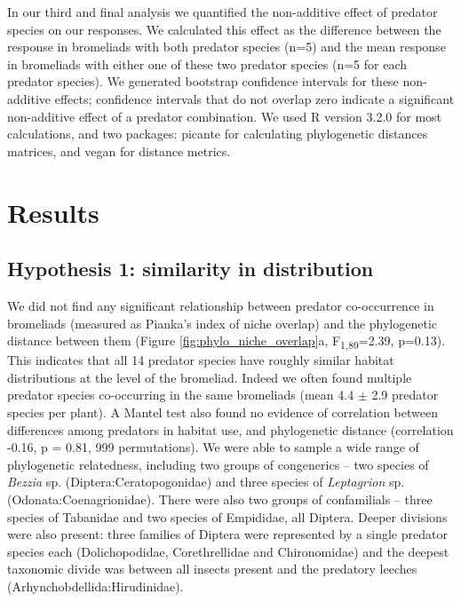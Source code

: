 \documentclass[11pt]{article}
\begin{document}
In our third and final analysis we quantified the non-additive effect of
predator species on our responses. We calculated this effect as the
difference between the response in bromeliads with both predator species
(n=5) and the mean response in bromeliads with either one of these two
predator species (n=5 for each predator species). We generated bootstrap
confidence intervals for these non-additive effects; confidence
intervals that do not overlap zero indicate a significant non-additive
effect of a predator combination. We used R version 3.2.0 \citealt{rcore}
for most calculations, and two packages: picante \citealt{picante} for
calculating phylogenetic distances matrices, and vegan \citealt{vegan} for
distance metrics.

\section*{Results}

\subsection*{Hypothesis 1: similarity in distribution}

We did not find any significant relationship between predator
co-occurrence in bromeliads (measured as Pianka's index of niche
overlap) and the phylogenetic distance between them (Figure \ref{fig:phylo_niche_overlap}a,
F\textsubscript{1,89}=2.39, p=0.13). This indicates that all 14 predator
species have roughly similar habitat distributions at the level of the
bromeliad. Indeed we often found multiple predator species co-occurring
in the same bromeliads (mean 4.4 $\pm$ 2.9 predator species per plant). A
Mantel test also found no evidence of correlation between differences
among predators in habitat use, and phylogenetic distance (correlation
-0.16, p = 0.81, 999 permutations). We were able to sample a wide range
of phylogenetic relatedness, including two groups of congenerics -- two
species of \emph{Bezzia} sp. (Diptera:Ceratopogonidae) and three species
of \emph{Leptagrion} sp. (Odonata:Coenagrionidae). There were also two
groups of confamilials -- three species of Tabanidae and two species of
Empididae, all Diptera. Deeper divisions were also present: three
families of Diptera were represented by a single predator species each
(Dolichopodidae, Corethrellidae and Chironomidae) and the deepest
taxonomic divide was between all insects present and the predatory
leeches (Arhynchobdellida:Hirudinidae).
\end{document}
